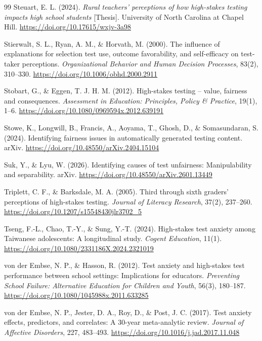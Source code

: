 \documentclass[11pt]{article}
\begin{document}
\begin{thebibliography}{99}
Steuart, E. L. (2024). \textit{Rural teachers' perceptions of how high-stakes testing impacts high school students} [Thesis]. University of North Carolina at Chapel Hill. \url{https://doi.org/10.17615/wxjv-3a98}

Stierwalt, S. L., Ryan, A. M., \& Horvath, M. (2000). The influence of explanations for selection test use, outcome favorability, and self-efficacy on test-taker perceptions. \textit{Organizational Behavior and Human Decision Processes}, 83(2), 310--330. \url{https://doi.org/10.1006/obhd.2000.2911}

Stobart, G., \& Eggen, T. J. H. M. (2012). High-stakes testing -- value, fairness and consequences. \textit{Assessment in Education: Principles, Policy \& Practice}, 19(1), 1--6. \url{https://doi.org/10.1080/0969594x.2012.639191}

Stowe, K., Longwill, B., Francis, A., Aoyama, T., Ghosh, D., \& Somasundaran, S. (2024). Identifying fairness issues in automatically generated testing content. arXiv. \url{https://doi.org/10.48550/arXiv.2404.15104}

Suk, Y., \& Lyu, W. (2026). Identifying causes of test unfairness: Manipulability and separability. arXiv. \url{https://doi.org/10.48550/arXiv.2601.13449}

Triplett, C. F., \& Barksdale, M. A. (2005). Third through sixth graders' perceptions of high-stakes testing. \textit{Journal of Literacy Research}, 37(2), 237--260. \url{https://doi.org/10.1207/s15548430jlr3702_5}

Tseng, F.-L., Chao, T.-Y., \& Sung, Y.-T. (2024). High-stakes test anxiety among Taiwanese adolescents: A longitudinal study. \textit{Cogent Education}, 11(1). \url{https://doi.org/10.1080/2331186X.2024.2321019}

von der Embse, N. P., \& Hasson, R. (2012). Test anxiety and high-stakes test performance between school settings: Implications for educators. \textit{Preventing School Failure: Alternative Education for Children and Youth}, 56(3), 180--187. \url{https://doi.org/10.1080/1045988x.2011.633285}

von der Embse, N. P., Jester, D. A., Roy, D., \& Post, J. C. (2017). Test anxiety effects, predictors, and correlates: A 30-year meta-analytic review. \textit{Journal of Affective Disorders}, 227, 483--493. \url{https://doi.org/10.1016/j.jad.2017.11.048}


\end{thebibliography}
\end{document}
